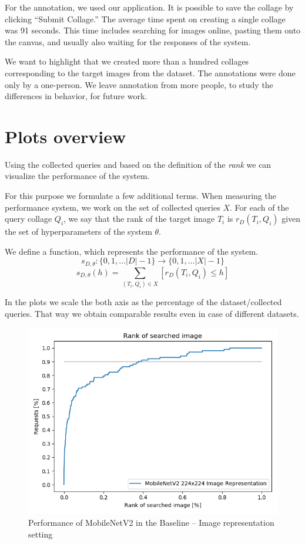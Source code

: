 For the annotation, we used our application. It is possible to save the collage by clicking ``Submit Collage.'' The average time spent on creating a single collage was 91 seconds. This time includes searching for images online, pasting them onto the canvas, and usually also waiting for the responses of the system.

We want to highlight that we created more than a hundred collages corresponding to the target images from the dataset. The annotations were done only by a one-person. We leave annotation from more people, to study the differences in behavior, for future work. 

\section{Plots overview}

Using the collected queries and based on the definition of the \emph{rank} we can visualize the performance of the system.

For this purpose we formulate a few additional terms. When measuring the performance system, we work on the set of collected queries $X$. For each of the query collage $Q_i$, we say that the rank of the target image $T_i$ is $r_D(T_i, Q_i)$ given the set of hyperparameters of the system $\theta$.

We define a function, which represents the performance of the system.
$$
s_{D, \theta}:\{0, 1, \ldots |D| - 1\} \rightarrow \{0, 1, \ldots |X| - 1\}
$$  
$$
s_{D, \theta}(h) = \sum_{(T_i, Q_i) \in X}[r_D(T_i, Q_i) \leq h]
$$

In the plots we scale the both axis as the percentage of the dataset/collected queries. That way we obtain comparable results even in case of different datasets.

\begin{figure}
    \centering
    \includegraphics[width=0.8\linewidth]{img/mobilenet_whole_image.png}
    \caption{Performance of MobileNetV2 in the Baseline -- Image representation setting}
    \label{fig:mobilenet_whole_image_example}
\end{figure}

